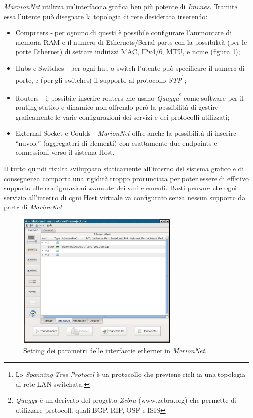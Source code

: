 \emph{MarnionNet} utilizza un'interfaccia grafica ben più potente di \emph{Imunes}. Tramite essa l'utente può disegnare\cite{MVNL08} la topologia di rete desiderata inserendo:
\begin{itemize}
 \item Computers - per ognuno di questi è possibile configurare l'ammontare di memoria RAM e il numero di Ethernets/Serial ports con la possibilità (per le porte Ethernet) di settare indirizzi MAC, IPv4/6, MTU, e nome (figura \ref{figura:marionnet_interfaces});
 \item Hubs e Switches - per ogni hub o switch l'utente può specificare il numero di porte, e (per gli switches) il supporto al protocollo \emph{STP}\footnote{Lo \emph{Spanning Tree Protocol} è un protocollo che previene cicli in una topologia di rete LAN switchata.};
 \item Routers - è possibile inserire routers che usano \emph{Quagga}\footnote{\emph{Quagga} è un derivato del progetto \emph{Zebra} (www.zebra.org) che permette di utilizzare protocolli quali BGP, RIP, OSF e ISIS} come software per il routing statico e dinamico non offrendo però la possibilità di gestire graficamente le varie configurazioni dei servizi e dei protocolli utilizzati;
 \item External Socket e Coulds - \emph{MarionNet} offre anche la possibilità di inserire ``nuvole'' (aggregatori di elementi) con esattamente due endpoints e connessioni verso il sistema Host.
\end{itemize}

Il tutto quindi risulta sviluppato staticamente all'interno del sistema grafico e di conseguenza comporta una rigidità troppo pronunciata per poter essere di effetivo supporto alle configurazioni avanzate dei vari elementi. Basti pensare che ogni servizio all'interno di ogni Host virtuale va configurato senza nessun supporto da parte di \emph{MarionNet}.

\begin{figure}[!ht]
	\centering
	\includegraphics[width=8cm]{images/marionnet_interfaces.png}
	\caption{Setting dei parametri delle interfaccie ethernet in \emph{MarionNet}.}
	\label{figura:marionnet_interfaces}
\end{figure}

